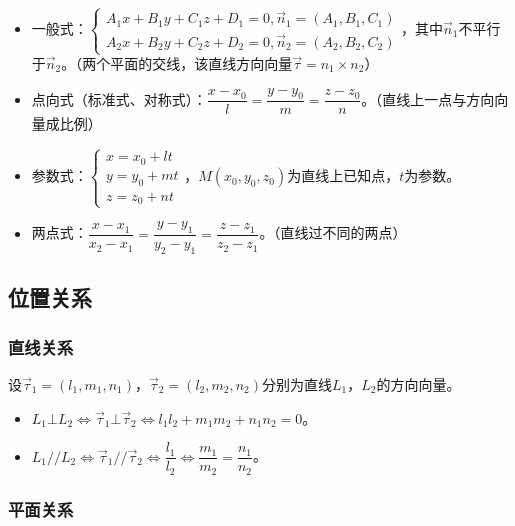 \documentclass[UTF8, 12pt]{ctexart}
\begin{document}
        \begin{itemize}
            \item 一般式：$\left\{\begin{array}{l}
                                     A_1x+B_1y+C_1z+D_1=0,\vec{n}_1=(A_1,B_1,C_1) \\
                                     A_2x+B_2y+C_2z+D_2=0,\vec{n}_2=(A_2,B_2,C_2)
            \end{array}\right.$，其中$\vec{n}_1$不平行于$\vec{n}_2$。（两个平面的交线，该直线方向向量$\vec{\tau}=n_1\times n_2$）
            \item 点向式（标准式、对称式）：$\dfrac{x-x_0}{l}=\dfrac{y-y_0}{m}=\dfrac{z-z_0}{n}$。（直线上一点与方向向量成比例）
            \item 参数式：$\left\{\begin{array}{l}
                                     x=x_0+lt \\
                                     y=y_0+mt \\
                                     z=z_0+nt
            \end{array}\right.$，$M(x_0,y_0,z_0)$为直线上已知点，$t$为参数。
            \item 两点式：$\dfrac{x-x_1}{x_2-x_1}=\dfrac{y-y_1}{y_2-y_1}=\dfrac{z-z_1}{z_2-z_1}$。（直线过不同的两点）
        \end{itemize}

        \subsection{位置关系}

        \subsubsection{直线关系}

        设$\vec{\tau}_1=(l_1,m_1,n_1)$，$\vec{\tau}_2=(l_2,m_2,n_2)$分别为直线$L_1$，$L_2$的方向向量。

        \begin{itemize}
            \item $L_1\bot L_2\Leftrightarrow\vec{\tau}_1\bot\vec{\tau}_2\Leftrightarrow l_1l_2+m_1m_2+n_1n_2=0$。
            \item $L_1//L_2\Leftrightarrow\vec{\tau}_1//\vec{\tau}_2\Leftrightarrow\dfrac{l_1}{l_2}\Leftrightarrow\dfrac{m_1}{m_2}=\dfrac{n_1}{n_2}$。
        \end{itemize}

        \subsubsection{平面关系}
\end{document}
